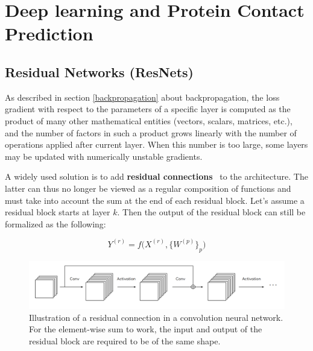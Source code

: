 \section{Deep learning and Protein Contact Prediction}

    \subsection{Residual Networks (ResNets)}

        As described in section \ref{backpropagation} about backpropagation,
        the loss gradient with respect to the parameters of a specific layer
        is computed as the product of many other mathematical entities
        (vectors, scalars, matrices, etc.), and the number of factors in such
        a product grows linearly with the number of operations applied after
        current layer. When this number is too large, some layers may be
        updated with numerically unstable gradients.

        A widely used solution is to add
        \textbf{residual connections}~\cite{DBLP:journals/corr/HeZRS15}
        to the architecture. The latter can thus no longer be viewed as
        a regular composition of functions and must take into account
        the sum at the end of each residual block.
        Let's assume a residual block starts at layer $k$. Then the output
        of the residual block can still be formalized as the following:

        \begin{equation}
            Y^{(r)} = f\big(X^{(r)}, \{W^{(p)}\}_p\big)
        \end{equation}

        \todo{}

        \begin{figure}[H]
            \begin{center}
                \includegraphics[width=\textwidth, keepaspectratio]{imgs/resnet.png}
                \caption{Illustration of a residual connection in a convolution
                neural network. For the element-wise sum to work, the input and output
                of the residual block are required to be of the same shape.}
                \label{resnet}
            \end{center}
        \end{figure}
    
